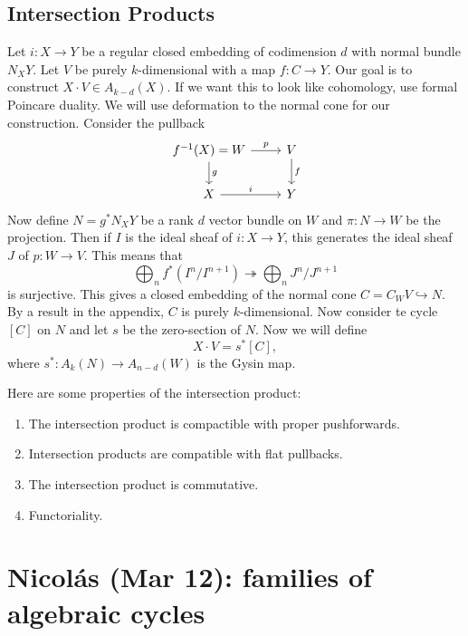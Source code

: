 \documentclass[leqno, openany]{memoir}
\theoremstyle{definition}
\theoremstyle{remark}
\theoremstyle{plain}
\theoremstyle{definition}
\theoremstyle{remark}
\begin{document}
\section{Intersection Products}%

Let $i \colon X \to Y$ be a regular closed embedding of codimension $d$ with
normal bundle $N_X Y$. Let $V$ be purely $k$-dimensional with a map $f \colon C
\to Y$. Our goal is to construct $X \cdot V \in A_{k-d}(X)$. If we want this to
look like cohomology, use formal Poincare duality. We will use deformation to
the normal cone for our construction. Consider the pullback \begin{equation*}
    \begin{tikzcd} f^{-1}(X) = W \ar{d}{g} \ar{r}{p} & V \ar{d}{f} \\ X
    \ar{r}{i} & Y \end{tikzcd} \end{equation*} Now define $N = g^* N_X Y$ be a
    rank $d$ vector bundle on $W$ and $\pi \colon N \to W$ be the projection.
    Then if $I$ is the ideal sheaf of $i \colon X \to Y$, this generates the
    ideal sheaf $J$ of $p \colon W \to V$. This means that \[ \bigoplus_n f^*
    (I^n / I^{n+1}) \twoheadrightarrow \bigoplus_n J^n / J^{n+1} \] is
    surjective. This gives a closed embedding of the normal cone $C = C_W V
    \hookrightarrow N$. By a result in the appendix, $C$ is purely
    $k$-dimensional. Now consider te cycle $[C]$ on $N$ and let $s$ be the
    zero-section of $N$. Now we will define \[ X \cdot V = s^* [C], \] where
    $s^* \colon A_k (N) \to A_{n-d}(W)$ is the Gysin map.

Here are some properties of the intersection product: \begin{enumerate} \item
    The intersection product is compactible with proper pushforwards.  \item
    Intersection products are compatible with flat pullbacks.  \item The
    intersection product is commutative.  \item Functoriality.  \end{enumerate}

\chapter{Nicol\'as (Mar 12): families of algebraic cycles}%
\label{cha:nicolas_mar_12_families_of_algebraic_cycles}
\end{document}
